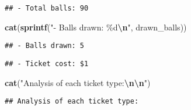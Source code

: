 \documentclass[
]{article}
\newenvironment{Shaded}{\begin{snugshade}}{\end{snugshade}}
\newcommand{\FunctionTok}[1]{\textcolor[rgb]{0.13,0.29,0.53}{\textbf{#1}}}
\newcommand{\NormalTok}[1]{#1}
\newcommand{\SpecialCharTok}[1]{\textcolor[rgb]{0.81,0.36,0.00}{\textbf{#1}}}
\newcommand{\StringTok}[1]{\textcolor[rgb]{0.31,0.60,0.02}{#1}}
\begin{document}
\begin{verbatim}
## - Total balls: 90
\end{verbatim}

\begin{Shaded}
\begin{Highlighting}[]
\FunctionTok{cat}\NormalTok{(}\FunctionTok{sprintf}\NormalTok{(}\StringTok{"{-} Balls drawn: \%d}\SpecialCharTok{\textbackslash{}n}\StringTok{"}\NormalTok{, drawn\_balls))}
\end{Highlighting}
\end{Shaded}

\begin{verbatim}
## - Balls drawn: 5
\end{verbatim}

\begin{Shaded}
\end{Shaded}

\begin{verbatim}
## - Ticket cost: $1
\end{verbatim}

\begin{Shaded}
\begin{Highlighting}[]
\FunctionTok{cat}\NormalTok{(}\StringTok{"Analysis of each ticket type:}\SpecialCharTok{\textbackslash{}n\textbackslash{}n}\StringTok{"}\NormalTok{)}
\end{Highlighting}
\end{Shaded}

\begin{verbatim}
## Analysis of each ticket type:
\end{verbatim}
\end{document}

